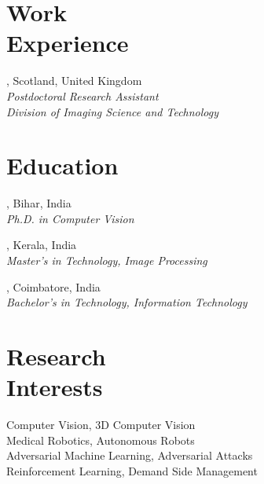 \documentclass[mm]{simple_style}
\begin{document}
\begin{resume}
	
\section{Work\\Experience}
, Scotland, United Kingdom \\
{\sl Postdoctoral Research Assistant} \\
\sl{Division of Imaging Science and Technology}

\sectionline

\section{Education}
, Bihar, India \\
{\sl Ph.D. in Computer Vision} \\

, Kerala, India \\
{\sl Master’s in Technology, Image Processing} \\

, Coimbatore, India \\
{\sl Bachelor’s in Technology, Information Technology} 

\sectionline

\section{Research\\Interests}
\par
Computer Vision, 3D Computer Vision \\
Medical Robotics, Autonomous Robots \\
Adversarial Machine Learning, Adversarial Attacks\\
Reinforcement Learning, Demand Side Management\\
\halfsectionline
\vspace{-8mm}

\end{resume}
\end{document}
